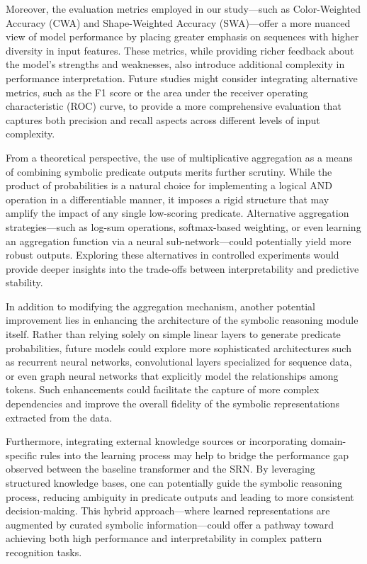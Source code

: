 \documentclass[11pt]{article}
\begin{document}
Moreover, the evaluation metrics employed in our study—such as Color-Weighted Accuracy (CWA) and Shape-Weighted Accuracy (SWA)—offer a more nuanced view of model performance by placing greater emphasis on sequences with higher diversity in input features. These metrics, while providing richer feedback about the model's strengths and weaknesses, also introduce additional complexity in performance interpretation. Future studies might consider integrating alternative metrics, such as the F1 score or the area under the receiver operating characteristic (ROC) curve, to provide a more comprehensive evaluation that captures both precision and recall aspects across different levels of input complexity.

From a theoretical perspective, the use of multiplicative aggregation as a means of combining symbolic predicate outputs merits further scrutiny. While the product of probabilities is a natural choice for implementing a logical AND operation in a differentiable manner, it imposes a rigid structure that may amplify the impact of any single low-scoring predicate. Alternative aggregation strategies—such as log-sum operations, softmax-based weighting, or even learning an aggregation function via a neural sub-network—could potentially yield more robust outputs. Exploring these alternatives in controlled experiments would provide deeper insights into the trade-offs between interpretability and predictive stability.

In addition to modifying the aggregation mechanism, another potential improvement lies in enhancing the architecture of the symbolic reasoning module itself. Rather than relying solely on simple linear layers to generate predicate probabilities, future models could explore more sophisticated architectures such as recurrent neural networks, convolutional layers specialized for sequence data, or even graph neural networks that explicitly model the relationships among tokens. Such enhancements could facilitate the capture of more complex dependencies and improve the overall fidelity of the symbolic representations extracted from the data.

Furthermore, integrating external knowledge sources or incorporating domain-specific rules into the learning process may help to bridge the performance gap observed between the baseline transformer and the SRN. By leveraging structured knowledge bases, one can potentially guide the symbolic reasoning process, reducing ambiguity in predicate outputs and leading to more consistent decision-making. This hybrid approach—where learned representations are augmented by curated symbolic information—could offer a pathway toward achieving both high performance and interpretability in complex pattern recognition tasks.
\end{document}
